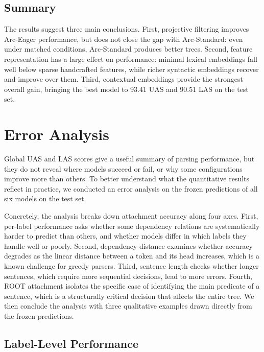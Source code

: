 \documentclass[12pt,letterpaper]{article}
\begin{document}
\subsection{Summary}
\label{subsec:results_summary}

The results suggest three main conclusions. First, projective filtering improves Arc-Eager performance, but does not close the gap with Arc-Standard: even under matched conditions, Arc-Standard produces better trees. Second, feature representation has a large effect on performance: minimal lexical embeddings fall well below sparse handcrafted features, while richer syntactic embeddings recover and improve over them. Third, contextual embeddings provide the strongest overall gain, bringing the best model to 93.41 UAS and 90.51 LAS on the test set.




\section{Error Analysis}
\label{sec:error_analysis}


Global UAS and LAS scores give a useful summary of parsing performance, but 
they do not reveal where models succeed or fail, or why some configurations 
improve more than others. To better understand what the quantitative results 
reflect in practice, we conducted an error analysis on the frozen predictions 
of all six models on the test set.

Concretely, the analysis breaks down attachment accuracy along four axes. 
First, per-label performance asks whether some dependency relations are 
systematically harder to predict than others, and whether models differ in 
which labels they handle well or poorly. Second, dependency distance examines 
whether accuracy degrades as the linear distance between a token and its head 
increases, which is a known challenge for greedy parsers. Third, sentence 
length checks whether longer sentences, which require more sequential 
decisions, lead to more errors. Fourth, ROOT attachment isolates the specific 
case of identifying the main predicate of a sentence, which is a 
structurally critical decision that affects the entire tree. We then conclude the analysis with three qualitative examples drawn directly from the frozen 
predictions.
\subsection{Label-Level Performance}
\label{subsec:label_errors}
\end{document}
